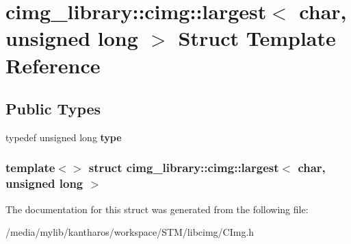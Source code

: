 \hypertarget{structcimg__library_1_1cimg_1_1largest_3_01char_00_01unsigned_01long_01_4}{
\section{cimg\_\-library::cimg::largest$<$ char, unsigned long $>$ Struct Template Reference}
\label{structcimg__library_1_1cimg_1_1largest_3_01char_00_01unsigned_01long_01_4}
}
\subsection*{Public Types}
\begin{DoxyCompactItemize}
\item 
\hypertarget{structcimg__library_1_1cimg_1_1largest_3_01char_00_01unsigned_01long_01_4_a2b84597019f808aacd9ca62ddf8e2318}{
typedef unsigned long {\bfseries type}}
\label{structcimg__library_1_1cimg_1_1largest_3_01char_00_01unsigned_01long_01_4_a2b84597019f808aacd9ca62ddf8e2318}

\end{DoxyCompactItemize}
\subsubsection*{template$<$$>$ struct cimg\_\-library::cimg::largest$<$ char, unsigned long $>$}



The documentation for this struct was generated from the following file:\begin{DoxyCompactItemize}
\item 
/media/mylib/kantharos/workspace/STM/libcimg/CImg.h\end{DoxyCompactItemize}
